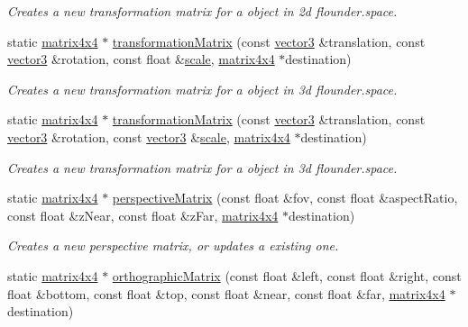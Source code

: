 \begin{DoxyCompactItemize}
\begin{DoxyCompactList}\small\item\em Creates a new transformation matrix for a object in 2d flounder.\+space. \end{DoxyCompactList}\item 
static \hyperlink{classflounder_1_1matrix4x4}{matrix4x4} $\ast$ \hyperlink{classflounder_1_1matrix4x4_ad4e44d13daacf0a9d51fdf5b3fcef315}{transformation\+Matrix} (const \hyperlink{classflounder_1_1vector3}{vector3} \&translation, const \hyperlink{classflounder_1_1vector3}{vector3} \&rotation, const float \&\hyperlink{classflounder_1_1matrix4x4_a5ac6ac7707c5e5c01654303b5b13c3ba}{scale}, \hyperlink{classflounder_1_1matrix4x4}{matrix4x4} $\ast$destination)
\begin{DoxyCompactList}\small\item\em Creates a new transformation matrix for a object in 3d flounder.\+space. \end{DoxyCompactList}\item 
static \hyperlink{classflounder_1_1matrix4x4}{matrix4x4} $\ast$ \hyperlink{classflounder_1_1matrix4x4_af068b46bbfe840dda2caa9d53c4a6092}{transformation\+Matrix} (const \hyperlink{classflounder_1_1vector3}{vector3} \&translation, const \hyperlink{classflounder_1_1vector3}{vector3} \&rotation, const \hyperlink{classflounder_1_1vector3}{vector3} \&\hyperlink{classflounder_1_1matrix4x4_a5ac6ac7707c5e5c01654303b5b13c3ba}{scale}, \hyperlink{classflounder_1_1matrix4x4}{matrix4x4} $\ast$destination)
\begin{DoxyCompactList}\small\item\em Creates a new transformation matrix for a object in 3d flounder.\+space. \end{DoxyCompactList}\item 
static \hyperlink{classflounder_1_1matrix4x4}{matrix4x4} $\ast$ \hyperlink{classflounder_1_1matrix4x4_aaaf16a53ae9936220587eaf454bf9483}{perspective\+Matrix} (const float \&fov, const float \&aspect\+Ratio, const float \&z\+Near, const float \&z\+Far, \hyperlink{classflounder_1_1matrix4x4}{matrix4x4} $\ast$destination)
\begin{DoxyCompactList}\small\item\em Creates a new perspective matrix, or updates a existing one. \end{DoxyCompactList}\item 
static \hyperlink{classflounder_1_1matrix4x4}{matrix4x4} $\ast$ \hyperlink{classflounder_1_1matrix4x4_ae44bdcd9e5a3ad141801a9da313e3fba}{orthographic\+Matrix} (const float \&left, const float \&right, const float \&bottom, const float \&top, const float \&near, const float \&far, \hyperlink{classflounder_1_1matrix4x4}{matrix4x4} $\ast$destination)

\end{DoxyCompactItemize}
